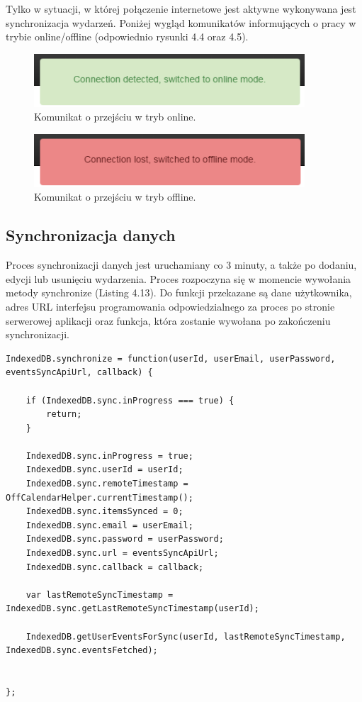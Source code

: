 Tylko w sytuacji, w której połączenie internetowe jest aktywne wykonywana jest synchronizacja wydarzeń. Poniżej wygląd komunikatów informujących o pracy w trybie online/offline (odpowiednio rysunki 4.4 oraz 4.5).

\begin{figure}[H]
\centering
\includegraphics[width=0.9\textwidth]{isOnline.png}
\caption{Komunikat o przejściu w tryb online.}
\end{figure}

\begin{figure}[H]
\centering
\includegraphics[width=0.9\textwidth]{isOffline.png}
\caption{Komunikat o przejściu w tryb offline.}
\end{figure}

\subsection{Synchronizacja danych}
\label{autSynDanych}

Proces synchronizacji danych jest uruchamiany co 3 minuty, a także po dodaniu, edycji lub usunięciu wydarzenia. Proces rozpoczyna się w momencie wywołania metody synchronize (Listing 4.13). Do funkcji przekazane są dane użytkownika, adres URL interfejsu programowania odpowiedzialnego za proces po stronie serwerowej aplikacji oraz funkcja, która zostanie wywołana po zakończeniu synchronizacji.

\begin{lstlisting}[caption=Funkcja synchronize rozpoczynająca proces synchronizacji., label=amb, captionpos=b]
IndexedDB.synchronize = function(userId, userEmail, userPassword, eventsSyncApiUrl, callback) {

	if (IndexedDB.sync.inProgress === true) {
    	return;
	}

	IndexedDB.sync.inProgress = true;
	IndexedDB.sync.userId = userId;
	IndexedDB.sync.remoteTimestamp = OffCalendarHelper.currentTimestamp();
	IndexedDB.sync.itemsSynced = 0;
	IndexedDB.sync.email = userEmail;
	IndexedDB.sync.password = userPassword;
	IndexedDB.sync.url = eventsSyncApiUrl;
	IndexedDB.sync.callback = callback;

	var lastRemoteSyncTimestamp = IndexedDB.sync.getLastRemoteSyncTimestamp(userId);

	IndexedDB.getUserEventsForSync(userId, lastRemoteSyncTimestamp, IndexedDB.sync.eventsFetched);


};
\end{lstlisting}


